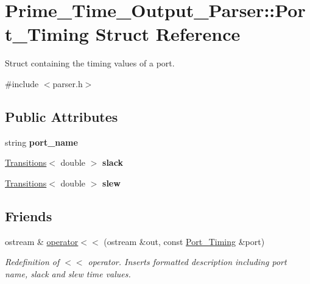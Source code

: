 \hypertarget{structPrime__Time__Output__Parser_1_1Port__Timing}{\section{Prime\-\_\-\-Time\-\_\-\-Output\-\_\-\-Parser\-:\-:Port\-\_\-\-Timing Struct Reference}
\label{structPrime__Time__Output__Parser_1_1Port__Timing}
}


Struct containing the timing values of a port.  




{\ttfamily \#include $<$parser.\-h$>$}

\subsection*{Public Attributes}
\begin{DoxyCompactItemize}
\item 
\hypertarget{structPrime__Time__Output__Parser_1_1Port__Timing_a4c7ae6cb0e76db94fe3b03822ead72c4}{string {\bfseries port\-\_\-name}}\label{structPrime__Time__Output__Parser_1_1Port__Timing_a4c7ae6cb0e76db94fe3b03822ead72c4}

\item 
\hypertarget{structPrime__Time__Output__Parser_1_1Port__Timing_a21231dfc490477789c81e0c9e3e8c18d}{\hyperlink{classTransitions}{Transitions}$<$ double $>$ {\bfseries slack}}\label{structPrime__Time__Output__Parser_1_1Port__Timing_a21231dfc490477789c81e0c9e3e8c18d}

\item 
\hypertarget{structPrime__Time__Output__Parser_1_1Port__Timing_a33e7eb34b63367e3b639999e1cb793bf}{\hyperlink{classTransitions}{Transitions}$<$ double $>$ {\bfseries slew}}\label{structPrime__Time__Output__Parser_1_1Port__Timing_a33e7eb34b63367e3b639999e1cb793bf}

\end{DoxyCompactItemize}
\subsection*{Friends}
\begin{DoxyCompactItemize}
\item 
\hypertarget{structPrime__Time__Output__Parser_1_1Port__Timing_abd555e7dc2c5bfe2b1699915d6b0ca8f}{ostream \& \hyperlink{structPrime__Time__Output__Parser_1_1Port__Timing_abd555e7dc2c5bfe2b1699915d6b0ca8f}{operator$<$$<$} (ostream \&out, const \hyperlink{structPrime__Time__Output__Parser_1_1Port__Timing}{Port\-\_\-\-Timing} \&port)}\label{structPrime__Time__Output__Parser_1_1Port__Timing_abd555e7dc2c5bfe2b1699915d6b0ca8f}

\begin{DoxyCompactList}\small\item\em Redefinition of $<$$<$ operator. Inserts formatted description including port name, slack and slew time values. \end{DoxyCompactList}\end{DoxyCompactItemize}



